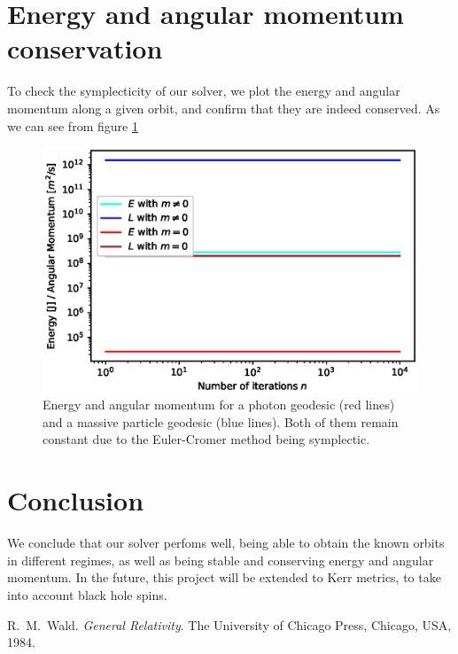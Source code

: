 \documentclass[journal, a4paper]{IEEEtran}
\begin{document}
\section{Energy and angular momentum conservation}
To check the symplecticity of our solver, we plot the energy and angular momentum along a given orbit, and confirm that they are indeed conserved. As we can see from figure \ref{fig::ConQuant} 
\begin{figure}[!hbt]
	\begin{center}
	\includegraphics[width=\columnwidth]{ConQuant.eps}
	\caption{Energy and angular momentum for a photon geodesic (red lines) and a massive particle geodesic (blue lines). Both of them remain constant due to the Euler-Cromer method being symplectic.}
	\label{fig::ConQuant}
\end{center}
\end{figure}
\section{Conclusion}
We conclude that our solver perfoms well, being able to obtain the known orbits in different regimes, as well as being stable and conserving energy and angular momentum. In the future, this project will be extended to Kerr metrics, to take into account black hole spins.
\begin{thebibliography}{5}

	R.~M.~Wald. {\em General Relativity}. The University of Chicago Press,
	Chicago, USA, 1984.

\end{thebibliography}

\end{document}
